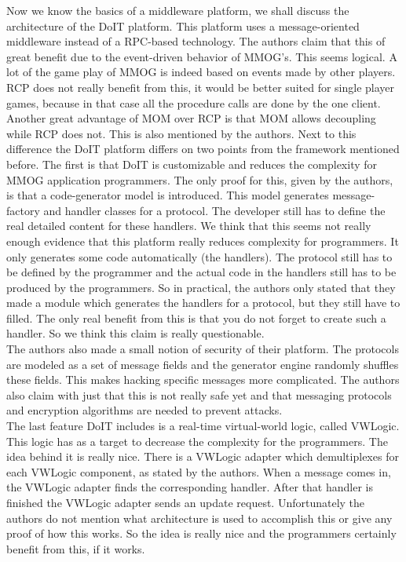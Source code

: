 \noindent Now we know the basics of a middleware platform, we shall discuss the architecture of the DoIT platform. 
This platform uses a message-oriented middleware instead of a RPC-based technology. 
The authors claim that this of great benefit due to the event-driven behavior of MMOG's. 
This seems logical. A lot of the game play of MMOG is indeed based on events made by other players. 
RCP does not really benefit from this, it would be better suited for single player games, because in that case all the procedure calls are done by the one client. \\
\indent Another great advantage of MOM over RCP is that MOM allows decoupling while RCP does not. 
This is also mentioned by the authors. 
Next to this difference the DoIT platform differs on two points from the framework mentioned before. 
The first is that DoIT is customizable and reduces the complexity for MMOG application programmers. 
The only proof for this, given by the authors, is that a code-generator model is introduced. 
This model generates message-factory and handler classes for a protocol. 
The developer still has to define the real detailed content for these handlers. 
We think that this seems not really enough evidence that this platform really reduces complexity for programmers. 
It only generates some code automatically (the handlers). 
The protocol still has to be defined by the programmer and the actual code in the handlers still has to be produced by the programmers. 
So in practical, the authors only stated that they made a module which generates the handlers for a protocol, but they still have to filled. The only real benefit from this is that you do not forget to create such a handler. So we think this claim is really questionable.\\
\indent The authors also made a small notion of security of their platform. 
The protocols are modeled as a set of message fields and the generator engine randomly shuffles these fields. 
This makes hacking specific messages more complicated. 
The authors also claim with just that this is not really safe yet and that messaging protocols and encryption algorithms are needed to prevent attacks.\\
\indent The last feature DoIT includes is a real-time virtual-world logic, called VWLogic. 
This logic has as a target to decrease the complexity for the programmers. 
The idea behind it is really nice. 
There is a VWLogic adapter which demultiplexes for each VWLogic component, as stated by the authors. 
When a message comes in, the VWLogic adapter finds the corresponding handler. 
After that handler is finished the VWLogic adapter sends an update request. 
Unfortunately the authors do not mention what architecture is used to accomplish this or give any proof of how this works. 
So the idea is really nice and the programmers certainly benefit from this, if it works.\\


